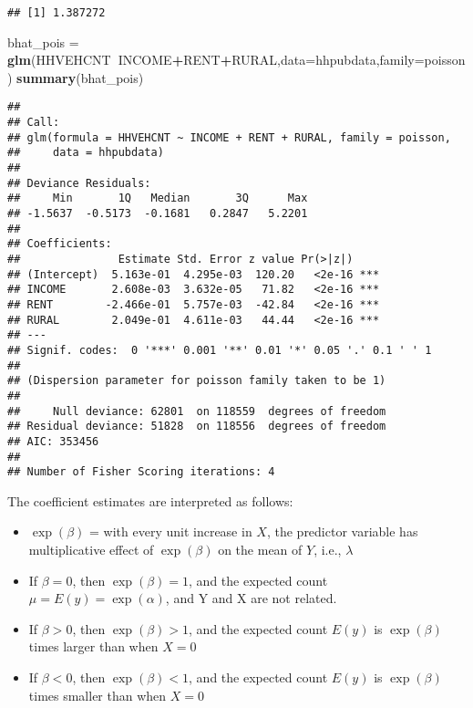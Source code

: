 \documentclass[
]{article}
\newenvironment{Shaded}{\begin{snugshade}}{\end{snugshade}}
\newcommand{\DataTypeTok}[1]{\textcolor[rgb]{0.13,0.29,0.53}{#1}}
\newcommand{\KeywordTok}[1]{\textcolor[rgb]{0.13,0.29,0.53}{\textbf{#1}}}
\newcommand{\NormalTok}[1]{#1}
\newcommand{\OperatorTok}[1]{\textcolor[rgb]{0.81,0.36,0.00}{\textbf{#1}}}
\newcommand{\StringTok}[1]{\textcolor[rgb]{0.31,0.60,0.02}{#1}}
\begin{document}
\begin{verbatim}
## [1] 1.387272
\end{verbatim}

\begin{Shaded}
\begin{Highlighting}[]
\NormalTok{bhat_pois =}\StringTok{ }\KeywordTok{glm}\NormalTok{(HHVEHCNT}\OperatorTok{~}\NormalTok{INCOME}\OperatorTok{+}\NormalTok{RENT}\OperatorTok{+}\NormalTok{RURAL,}\DataTypeTok{data=}\NormalTok{hhpubdata,}\DataTypeTok{family=}\NormalTok{poisson)}
\KeywordTok{summary}\NormalTok{(bhat_pois)}
\end{Highlighting}
\end{Shaded}

\begin{verbatim}
## 
## Call:
## glm(formula = HHVEHCNT ~ INCOME + RENT + RURAL, family = poisson, 
##     data = hhpubdata)
## 
## Deviance Residuals: 
##     Min       1Q   Median       3Q      Max  
## -1.5637  -0.5173  -0.1681   0.2847   5.2201  
## 
## Coefficients:
##               Estimate Std. Error z value Pr(>|z|)    
## (Intercept)  5.163e-01  4.295e-03  120.20   <2e-16 ***
## INCOME       2.608e-03  3.632e-05   71.82   <2e-16 ***
## RENT        -2.466e-01  5.757e-03  -42.84   <2e-16 ***
## RURAL        2.049e-01  4.611e-03   44.44   <2e-16 ***
## ---
## Signif. codes:  0 '***' 0.001 '**' 0.01 '*' 0.05 '.' 0.1 ' ' 1
## 
## (Dispersion parameter for poisson family taken to be 1)
## 
##     Null deviance: 62801  on 118559  degrees of freedom
## Residual deviance: 51828  on 118556  degrees of freedom
## AIC: 353456
## 
## Number of Fisher Scoring iterations: 4
\end{verbatim}

The coefficient estimates are interpreted as follows:

\begin{itemize}
\item
  \(\exp(\beta)\) = with every unit increase in \(X\), the predictor variable has multiplicative effect of \(\exp(\beta)\) on the mean of \(Y\), i.e., \(\lambda\)
\item
  If \(\beta=0\), then \(\exp(\beta) = 1\), and the expected count \(\mu= E(y) = \exp(\alpha)\), and Y and X are not related.
\item
  If \(\beta>0\), then \(\exp(\beta) > 1\), and the expected count \(E(y)\) is \(\exp(\beta)\) times larger than when \(X = 0\)
\item
  If \(\beta<0\), then \(\exp(\beta) < 1\), and the expected count \(E(y)\) is \(\exp(\beta)\) times smaller than when \(X = 0\)
\end{itemize}
\end{document}

